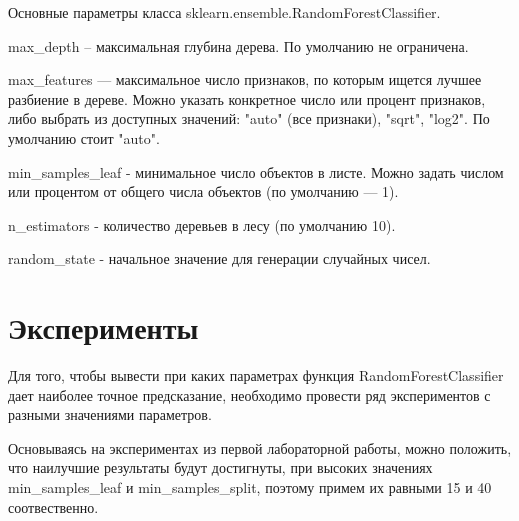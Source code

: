 \documentclass[a4paper,12pt]{article}
\begin{document}
	\vspace{0.5cm}
	Основные параметры класса sklearn.ensemble.RandomForestClassifier.
	
	\vspace{0.5cm}
	max\_depth – максимальная глубина дерева. По умолчанию не ограничена.
	
	\vspace{0.5cm}
	max\_features — максимальное число признаков, по которым ищется лучшее разбиение в дереве. Можно указать конкретное число или процент признаков, либо выбрать из доступных значений: "auto" (все признаки), "sqrt", "log2". По умолчанию стоит "auto".
	
	\vspace{0.5cm}
	min\_samples\_leaf - минимальное число объектов в листе. Можно задать числом или процентом от общего числа объектов (по умолчанию — 1).
	
	\vspace{0.5cm}
	n\_estimators - количество деревьев в лесу (по умолчанию 10).
	
	\vspace{0.5cm}
	random\_state - начальное значение для генерации случайных чисел.

	
\newpage\section{Эксперименты}
	Для того, чтобы вывести при каких параметрах функция RandomForestClassifier дает наиболее точное предсказание, необходимо провести ряд экспериментов с разными значениями параметров. 
	
	\vspace{0.5cm}
	Основываясь на экспериментах из первой лабораторной работы, можно положить, что наилучшие результаты будут достигнуты, при высоких значениях min\_samples\_leaf и min\_samples\_split, поэтому примем их равными 15 и 40 соотвественно.
	
\end{document}
